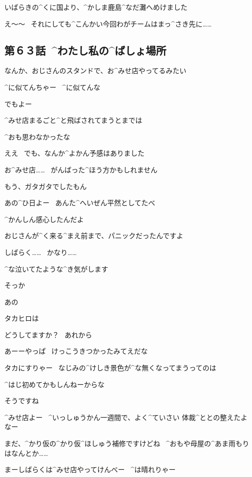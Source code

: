\Person いばらきの^{くに}{国}より、^{かしま}{鹿島}^{なだ}{灘}へめけました

\Person え〜〜
\ それにしても^{こんかい}{今回}わがチームはまっ^{さき}{先}に……


\subsection{第６３話\ ^{わたし}{私}の^{ばしょ}{場所}}

\page[118]
\Alpha なんか、おじさんのスタンドで、お^{みせ}{店}やってるみたい

\Ojisan ^{に}{似}てんちゃー
\ ^{に}{似}てんな

\Ojisan でもよー

\Ojisan ^{みせ}{店}まるごと^{と}{飛}ばされてまうとまでは

\Ojisan ^{おも}{思}わなかったな

\Alpha ええ
\ でも、なんか^{よかん}{予感}はありました

\page[119]
\Alpha お^{みせ}{店}……
\ がんばった^{ほう}{方}かもしれません

\Alpha もう、ガタガタでしたもん

\Ojisan あの^{ひ}{日}よー
\ あんた^{へいぜん}{平然}としてたべ

\Ojisan ^{かんしん}{感心}したんだよ

\Alpha おじさんが^{く}{来}る^{まえ}{前}まで、パニックだったんですよ

\Alpha しばらく……
\ かなり……

\Alpha ^{な}{泣}いてたような^{き}{気}がします

\page[120]
\Ojisan そっか

\Alpha あの

\Alpha タカヒロは

\Alpha どうしてますか？
\ あれから

\page[121]
\Ojisan あーーやっぱ
\ けっこうきつかったみてえだな

\Ojisan タカにすりゃー
\ なじみの^{けしき}{景色}が^{な}{無}くなってまうってのは

\Ojisan ^{はじ}{初}めてかもしんねーからな

\Alpha そうですね

\page[122]
\Ojisan ^{みせ}{店}よー
\ ^{いっしゅうかん}{一週間}で、よく^{ていさい }{体裁}^{ととの}{整}えたよなー

\Alpha まだ、^{かり}{仮}の^{かり}{仮}^{ほしゅう}{補修}ですけどね
\ ^{おもや}{母屋}の^{あま}{雨}もりはなんとか……

\Ojisan まーしばらくは^{みせ}{店}やってけんべー
\ ^{は}{晴}れりゃー

